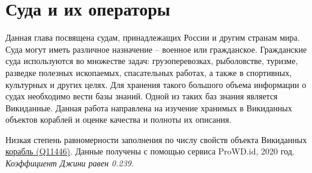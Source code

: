 \chapter{Суда и их операторы}
\label{ch:ships-chapter}

Данная глава посвящена судам, принадлежащих России и другим странам мира. Суда могут иметь различное назначение -- военное или гражданское. Гражданские суда используются во множестве задач: грузоперевозках, рыболовстве, туризме, разведке полезных ископаемых, спасательных работах, а также в спортивных, культурных и других целях. Для хранения такого большого объема информации о судах необходимо вести базы знаний. Одной из таких баз знания является Викиданные. Данная работа направлена на изучение хранимых в Викиданных объектов кораблей и оценке качества и полноты их описания.


\begin{marginfigure}[0.0cm]
  {
    \setlength{\fboxsep}{0pt}%
    \setlength{\fboxrule}{1pt}%
  }
  \caption{
    Низкая степень равномерности заполнения по числу свойств объекта Викиданных \href{https://www.wikidata.org/wiki/Q11446}{корабль (Q11446)}.  Данные получены с помощью сервиса ProWD.id, 2020 год. \emph{Коэффициент Джини равен 0.239.}
    }%
    \label{fig:prowd_ships-unbalanced}%
  \end{marginfigure}


